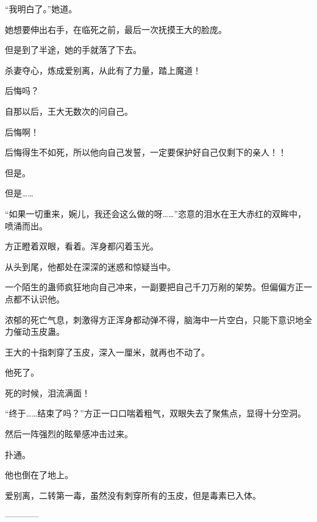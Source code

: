 \begin{this_body}
“我明白了。”她道。

她想要伸出右手，在临死之前，最后一次抚摸王大的脸庞。

但是到了半途，她的手就落了下去。

杀妻夺心，炼成爱别离，从此有了力量，踏上魔道！

后悔吗？

自那以后，王大无数次的问自己。

后悔啊！

后悔得生不如死，所以他向自己发誓，一定要保护好自己仅剩下的亲人！！

但是。

但是……

“如果一切重来，婉儿，我还会这么做的呀……”恣意的泪水在王大赤红的双眸中，喷涌而出。

方正瞪着双眼，看着。浑身都闪着玉光。

从头到尾，他都处在深深的迷惑和惊疑当中。

一个陌生的蛊师疯狂地向自己冲来，一副要把自己千刀万剐的架势。但偏偏方正一点都不认识他。

浓郁的死亡气息，刺激得方正浑身都动弹不得，脑海中一片空白，只能下意识地全力催动玉皮蛊。

王大的十指刺穿了玉皮，深入一厘米，就再也不动了。

他死了。

死的时候，泪流满面！

“终于……结束了吗？”方正一口口喘着粗气，双眼失去了聚焦点，显得十分空洞。

然后一阵强烈的眩晕感冲击过来。

扑通。

他也倒在了地上。

爱别离，二转第一毒，虽然没有刺穿所有的玉皮，但是毒素已入体。

------------

\end{this_body}

